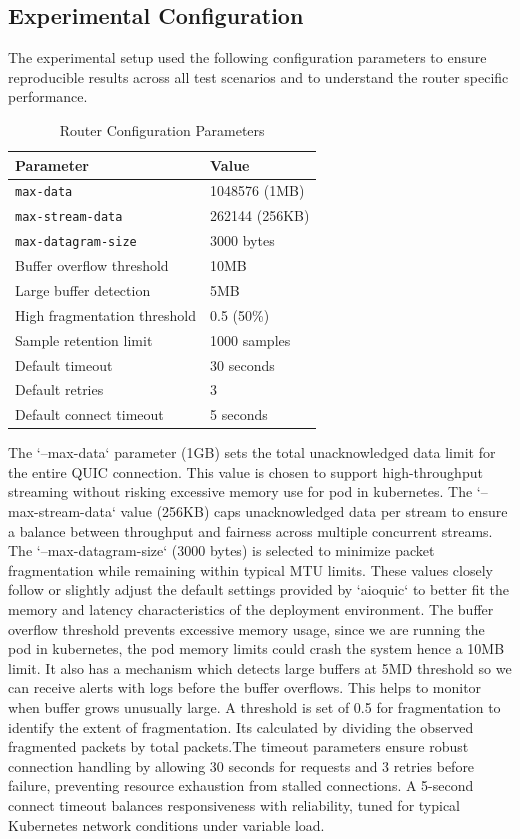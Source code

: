 \subsection{Experimental Configuration}
The experimental setup used the following configuration parameters to ensure reproducible results across all test scenarios and to understand the router specific performance.

\begin{table}[h!]
\centering
\caption{Router Configuration Parameters}
\label{tab:router-config}
\renewcommand{\arraystretch}{1.3} %
\begin{tabular}{|l|l|}
\hline
\textbf{Parameter} & \textbf{Value} \\
\hline
\texttt{max-data} & 1048576 (1MB) \\
\hline
\texttt{max-stream-data} & 262144 (256KB) \\
\hline
\texttt{max-datagram-size} & 3000 bytes\\
\hline
Buffer overflow threshold & 10MB\\
\hline
Large buffer detection & 5MB \\
\hline
High fragmentation threshold & 0.5 (50\%) \\
\hline
Sample retention limit & 1000 samples \\
\hline
Default timeout & 30 seconds  \\
\hline
Default retries & 3 \\
\hline
Default connect timeout & 5 seconds \\
\hline
\end{tabular}
\end{table}

The `--max-data` parameter (1GB) sets the total unacknowledged data limit for the entire QUIC connection. This value is chosen to support high-throughput streaming without risking excessive memory use for pod in kubernetes. The `--max-stream-data` value (256KB) caps unacknowledged data per stream to ensure a balance between throughput and fairness across multiple concurrent streams. The `--max-datagram-size` (3000 bytes) is selected to minimize packet fragmentation while remaining within typical MTU limits. These values closely follow or slightly adjust the default settings provided by `aioquic` to better fit the memory and latency characteristics of the deployment environment. The buffer overflow threshold prevents excessive memory usage, since we are running the pod in kubernetes, the pod memory limits could crash the system hence a 10MB limit. It also has a mechanism which detects large buffers at 5MD threshold so we can receive alerts with logs before the buffer overflows. This helps to monitor when buffer grows unusually large. A threshold is set of 0.5 for fragmentation to identify the extent of fragmentation. Its calculated by dividing the observed fragmented packets by total packets.The timeout parameters ensure robust connection handling by allowing 30 seconds for requests and 3 retries before failure, preventing resource exhaustion from stalled connections.  
A 5-second connect timeout balances responsiveness with reliability, tuned for typical Kubernetes network conditions under variable load.


